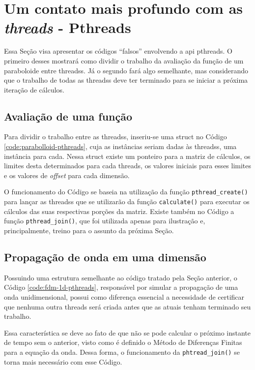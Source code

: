 \section{Um contato mais profundo com as \textit{threads} - Pthreads}
Essa Seção visa apresentar os códigos ``falsos'' envolvendo a \acrshort{api} \acrfull{pthreads}.
O primeiro desses mostrará como dividir o trabalho da avaliação da função de um paraboloide 
entre \glspl{threads}. Já o segundo fará algo semelhante, mas considerando que o trabalho de todas as 
\glspl{threads} deve ter terminado para se iniciar a próxima iteração de cálculos. 

\subsection{Avaliação de uma função}
Para dividir o trabalho entre as \glspl{threads}, inseriu-se uma \gls{struct} no Código \ref{code:parabolloid-pthreads}, cuja as instâncias seriam dadas às \glspl{threads}, uma instância para cada. 
Nessa \gls{struct} existe um ponteiro para a matriz de cálculos, os limites desta determinados para cada \gls{threads}, os valores iniciais para esses limites e os valores de \textit{offset} para cada dimensão.

O funcionamento do Código se baseia na utilização da função \texttt{pthread\_create()} para lançar as \glspl{threads} que se utilizarão da função \texttt{calculate()} para executar os cálculos das suas respectivas porções da matriz. Existe também no Código a função \texttt{pthread\_join()}, que foi utilizada apenas para ilustração e, principalmente, treino para o assunto da próxima Seção.

\subsection{Propagação de onda em uma dimensão}
Possuindo uma estrutura semelhante ao código tratado pela Seção anterior, o Código \ref{code:fdm-1d-pthreads}, responsável por simular a propagação de uma onda unidimensional, possui como diferença essencial a necessidade de certificar que nenhuma outra \gls{threads} será criada antes que as atuais tenham terminado seu trabalho. 

Essa característica se deve ao fato de que não se pode calcular o próximo instante de tempo sem o anterior, visto como é definido o Método de Diferenças Finitas para a equação da onda. Dessa forma, o funcionamento da \texttt{phtread\_join()} se torna mais necessário com esse Código.